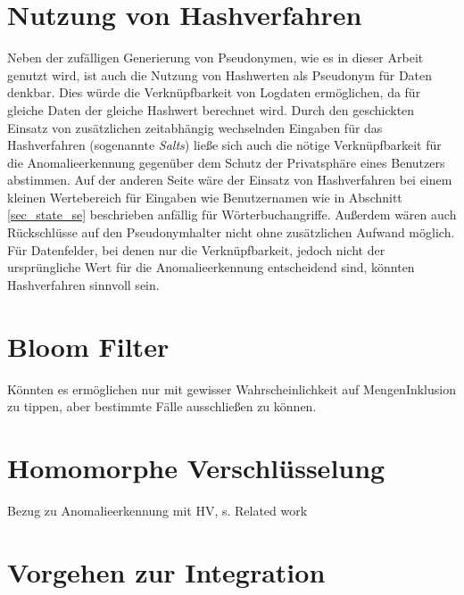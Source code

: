 \section{Nutzung von Hashverfahren}

Neben der zufälligen Generierung von Pseudonymen, wie es in dieser Arbeit genutzt wird, ist auch die Nutzung von Hashwerten als Pseudonym für Daten denkbar. Dies würde die Verknüpfbarkeit von Logdaten ermöglichen, da für gleiche Daten der gleiche Hashwert berechnet wird. Durch den geschickten Einsatz von zusätzlichen zeitabhängig wechselnden Eingaben für das Hashverfahren (sogenannte \textit{Salts}) ließe sich auch die nötige Verknüpfbarkeit für die Anomalieerkennung gegenüber dem Schutz der Privatsphäre eines Benutzers abstimmen. Auf der anderen Seite wäre der Einsatz von Hashverfahren bei einem kleinen Wertebereich für Eingaben wie Benutzernamen wie in Abschnitt \ref{sec_state_se} beschrieben anfällig für Wörterbuchangriffe. Außerdem wären auch Rückschlüsse auf den Pseudonymhalter nicht ohne zusätzlichen Aufwand möglich. Für Datenfelder, bei denen nur die Verknüpfbarkeit, jedoch nicht der ursprüngliche Wert für die Anomalieerkennung entscheidend sind, könnten Hashverfahren sinnvoll sein. 

\section{Bloom Filter}

Könnten es ermöglichen nur mit gewisser Wahrscheinlichkeit auf MengenInklusion zu tippen, aber bestimmte Fälle ausschließen zu können.

\section{Homomorphe Verschlüsselung}

Bezug zu Anomalieerkennung mit HV, s. Related work


\section{Vorgehen zur Integration}

